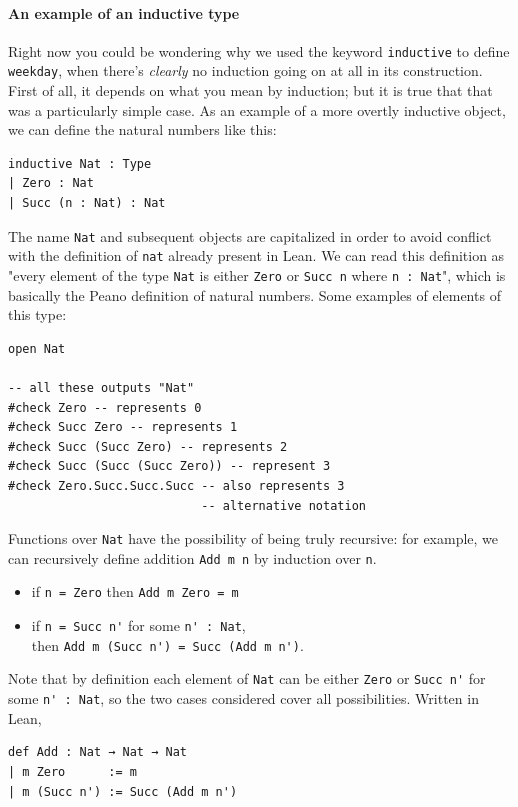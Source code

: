 \documentclass{book}
\theoremstyle{definition}
\theoremstyle{remark}
\theoremstyle{plain}
\begin{document}
\paragraph{An example of an inductive type}
Right now you could be wondering why we used the keyword \lstinline{inductive} to define \lstinline{weekday},
when there's \textit{clearly} no induction going on at all in its construction.
First of all, it depends on what you mean by induction; but it is true that that was a particularly simple case.
As an example of a more overtly inductive object, we can define the natural numbers like this:
\begin{lstlisting}
inductive Nat : Type
| Zero : Nat
| Succ (n : Nat) : Nat
\end{lstlisting}
The name \lstinline{Nat} and subsequent objects are capitalized in order to avoid conflict with the definition of \lstinline{nat} already present in Lean.
We can read this definition as "every element of the type \lstinline{Nat} is either \lstinline{Zero}
or \lstinline{Succ n} where \lstinline{n : Nat}",
which is basically the Peano definition of natural numbers.
Some examples of elements of this type:
\begin{lstlisting}
open Nat

-- all these outputs "Nat"
#check Zero -- represents 0
#check Succ Zero -- represents 1
#check Succ (Succ Zero) -- represents 2
#check Succ (Succ (Succ Zero)) -- represent 3
#check Zero.Succ.Succ.Succ -- also represents 3
                           -- alternative notation
\end{lstlisting}
Functions over \lstinline{Nat} have the possibility of being truly recursive:
for example, we can recursively define addition \lstinline{Add m n} by induction over \lstinline{n}.
\begin{itemize}
\item if \lstinline{n = Zero} then \lstinline{Add m Zero = m}
\item if \lstinline{n = Succ n'} for some \lstinline{n' : Nat}, \\
      then \lstinline{Add m (Succ n') = Succ (Add m n')}.
\end{itemize}
Note that by definition each element of \lstinline{Nat} can be either \lstinline{Zero} or \lstinline{Succ n'} for some \lstinline{n' : Nat},
so the two cases considered cover all possibilities.
Written in Lean,
\begin{lstlisting}
def Add : Nat → Nat → Nat
| m Zero      := m
| m (Succ n') := Succ (Add m n')
\end{lstlisting}
\end{document}
